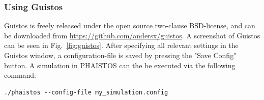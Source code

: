 \subsubsection{Using Guistos}

Guistos is freely released under the open source two-clause BSD-license, and can be downloaded from \url{https://github.com/andersx/guistos}. A screenshot of Guistos can be seen in Fig.~\ref{fig:guistos}. 
After specifying all relevant settings in the Guistos window, a configuration-file is saved by pressing the "Save Config" button.
A simulation in PHAISTOS can the be executed via the following command:
\begin{lstlisting}
./phaistos --config-file my_simulation.config
\end{lstlisting}








